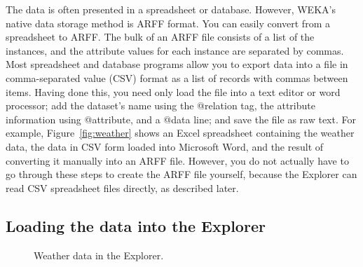 The data is often presented in a spreadsheet or database. However,
WEKA's native data storage method is ARFF format. You can easily
convert from a spreadsheet to ARFF. The bulk of an ARFF file consists
of a list of the instances, and the attribute values for each instance
are separated by commas. Most spreadsheet and database programs allow
you to export data into a file in comma-separated value (CSV) format
as a list of records with commas between items. Having done this, you
need only load the file into a text editor or word processor; add the
dataset's name using the @relation tag, the attribute information
using @attribute, and a @data line; and save the file as raw text. For
example, Figure~\ref{fig:weather} shows an Excel spreadsheet
containing the weather data, the data in CSV form loaded into
Microsoft Word, and the result of converting it manually into an ARFF
file. However, you do not actually have to go through these steps to
create the ARFF file yourself, because the Explorer can read CSV
spreadsheet files directly, as described later.

\subsection{Loading the data into the Explorer}

\begin{figure}[!th]
\centering
{}
\qquad
{}
\caption{\label{fig:weather_explorer}Weather data in the Explorer.}
\end{figure}

